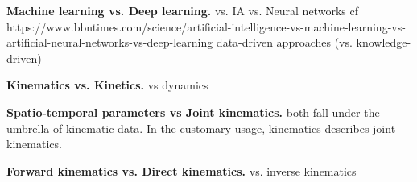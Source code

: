 \vspace*{0.5cm}

\noindent\textbf{Machine learning vs. Deep learning. }
vs. IA vs. Neural networks
cf https://www.bbntimes.com/science/artificial-intelligence-vs-machine-learning-vs-artificial-neural-networks-vs-deep-learning
data-driven approaches (vs. knowledge-driven)

\vspace*{0.5cm}

\noindent\textbf{Kinematics vs. Kinetics. }
vs dynamics

\vspace*{0.5cm}

\noindent\textbf{Spatio-temporal parameters vs Joint kinematics. }
both fall under the umbrella of kinematic data. In the customary usage, kinematics describes joint kinematics.

\vspace*{0.5cm}

\noindent\textbf{Forward kinematics vs. Direct kinematics. }
vs. inverse kinematics





